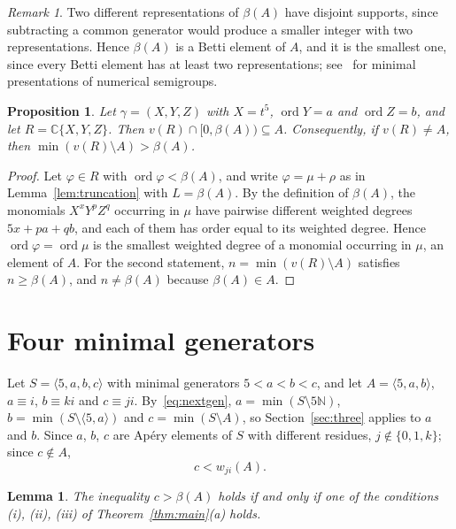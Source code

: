 \documentclass{amsart}
\newtheorem{proposition}[theorem]{Proposition}
\newtheorem{lemma}[theorem]{Lemma}
\theoremstyle{definition}
\theoremstyle{remark}
\newtheorem{remark}[theorem]{Remark}
\numberwithin{equation}{section}
\newcommand{\N}{\mathbb{N}}
\newcommand{\C}{\mathbb{C}}
\newcommand{\ord}{\operatorname{ord}}
\newcommand{\gen}[1]{\langle #1\rangle}
\begin{document}
\begin{remark}\label{rem:betti}
Two different representations of $\beta(A)$ have disjoint supports, since subtracting a common generator would produce a smaller integer with two representations. Hence $\beta(A)$ is a Betti element of $A$, and it is the smallest one, since every Betti element has at least two representations; see~\cite{RGS} for minimal presentations of numerical semigroups.
\end{remark}

\begin{proposition}\label{prop:first}
Let $\gamma=(X,Y,Z)$ with $X=t^5$, $\ord Y=a$ and $\ord Z=b$, and let $R=\C\{X,Y,Z\}$. Then $v(R)\cap[0,\beta(A))\subseteq A$. Consequently, if $v(R)\ne A$, then $\min(v(R)\setminus A)>\beta(A)$.
\end{proposition}

\begin{proof}
Let $\varphi\in R$ with $\ord\varphi<\beta(A)$, and write $\varphi=\mu+\rho$ as in Lemma~\ref{lem:truncation} with $L=\beta(A)$. By the definition of $\beta(A)$, the monomials $X^xY^pZ^q$ occurring in $\mu$ have pairwise different weighted degrees $5x+pa+qb$, and each of them has order equal to its weighted degree. Hence $\ord\varphi=\ord\mu$ is the smallest weighted degree of a monomial occurring in $\mu$, an element of $A$. For the second statement, $n=\min(v(R)\setminus A)$ satisfies $n\ge\beta(A)$, and $n\ne\beta(A)$ because $\beta(A)\in A$.
\end{proof}

\section{Four minimal generators}\label{sec:four}

Let $S=\gen{5,a,b,c}$ with minimal generators $5<a<b<c$, and let $A=\gen{5,a,b}$, $a\equiv i$, $b\equiv ki$ and $c\equiv ji$. By~\eqref{eq:nextgen}, $a=\min(S\setminus5\N)$, $b=\min(S\setminus\gen{5,a})$ and $c=\min(S\setminus A)$, so Section~\ref{sec:three} applies to $a$ and $b$. Since $a$, $b$, $c$ are Ap\'ery elements of $S$ with different residues, $j\notin\{0,1,k\}$; since $c\notin A$,
\begin{equation}\label{eq:cbound}
c<w_{ji}(A).
\end{equation}

\begin{lemma}\label{lem:explicit4}
The inequality $c>\beta(A)$ holds if and only if one of the conditions \textup{(i)}, \textup{(ii)}, \textup{(iii)} of Theorem~\textup{\ref{thm:main}(a)} holds.
\end{lemma}
\end{document}
